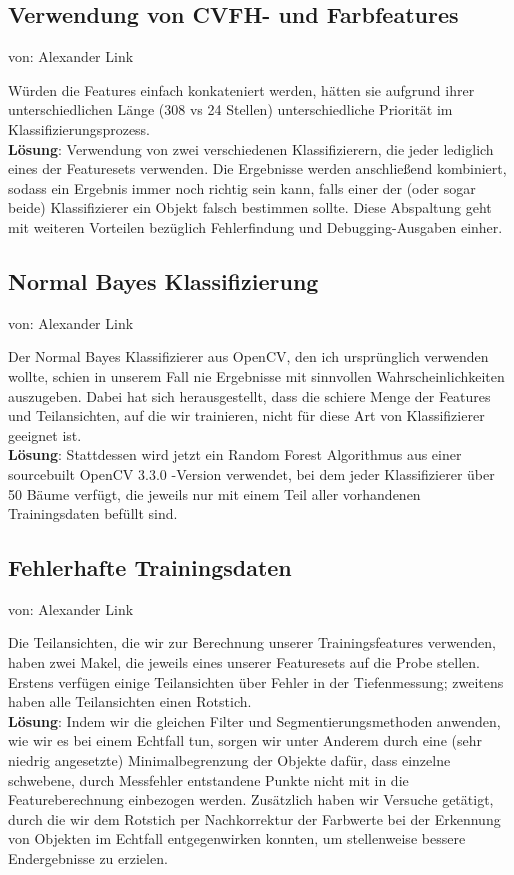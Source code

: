 \documentclass{suturo}
\makeatletter
\newcommand{\chapterauthor}[1]{%
  {\parindent0pt\vspace*{-27pt}%
  \linespread{0}\small\begin{flushright}von: #1\end{flushright}%
  \par\nobreak\vspace*{0pt}}
  \@afterheading%
}
\makeatother
\begin{document}
\subsection{Verwendung von CVFH- und Farbfeatures}
\chapterauthor{Alexander Link}
Würden die Features einfach konkateniert werden, hätten sie aufgrund ihrer unterschiedlichen Länge (308 vs 24 Stellen) unterschiedliche Priorität im Klassifizierungsprozess. \\
\textbf{Lösung}: Verwendung von zwei verschiedenen Klassifizierern, die jeder lediglich eines der Featuresets verwenden. Die Ergebnisse werden anschließend kombiniert, sodass ein Ergebnis immer noch richtig sein kann, falls einer der (oder sogar beide) Klassifizierer ein Objekt falsch bestimmen sollte. Diese Abspaltung geht mit weiteren Vorteilen bezüglich Fehlerfindung und Debugging-Ausgaben einher.

\subsection{Normal Bayes Klassifizierung}
\chapterauthor{Alexander Link}
Der Normal Bayes Klassifizierer aus OpenCV, den ich ursprünglich verwenden wollte, schien in unserem Fall nie Ergebnisse mit sinnvollen Wahrscheinlichkeiten auszugeben. Dabei hat sich herausgestellt, dass die schiere Menge der Features und Teilansichten, auf die wir trainieren, nicht für diese Art von Klassifizierer geeignet ist. \\
\textbf{Lösung}: Stattdessen wird jetzt ein Random Forest Algorithmus aus einer sourcebuilt OpenCV 3.3.0 -Version verwendet, bei dem jeder Klassifizierer über 50 Bäume verfügt, die jeweils nur mit einem Teil aller vorhandenen Trainingsdaten befüllt sind.

\subsection{Fehlerhafte Trainingsdaten}
\chapterauthor{Alexander Link}
Die Teilansichten, die wir zur Berechnung unserer Trainingsfeatures verwenden, haben zwei Makel, die jeweils eines unserer Featuresets auf die Probe stellen. Erstens verfügen einige Teilansichten über Fehler in der Tiefenmessung; zweitens haben alle Teilansichten einen Rotstich. \\
\textbf{Lösung}: Indem wir die gleichen Filter und Segmentierungsmethoden anwenden, wie wir es bei einem Echtfall tun, sorgen wir unter Anderem durch eine (sehr niedrig angesetzte) Minimalbegrenzung der Objekte dafür, dass einzelne schwebene, durch Messfehler entstandene Punkte nicht mit in die Featureberechnung einbezogen werden. Zusätzlich haben wir Versuche getätigt, durch die wir dem Rotstich per Nachkorrektur der Farbwerte bei der Erkennung von Objekten im Echtfall entgegenwirken konnten, um stellenweise bessere Endergebnisse zu erzielen.
\end{document}
